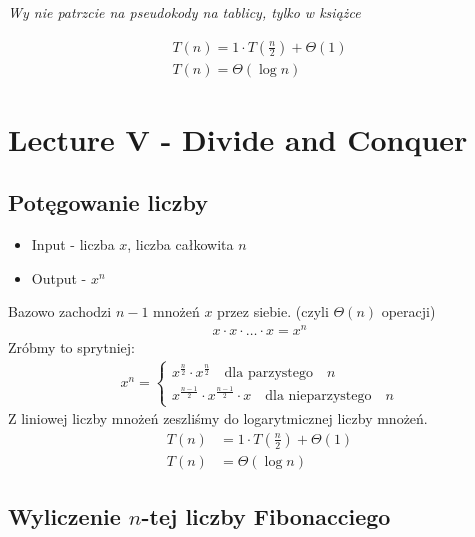 \documentclass{article}
\numberwithin{equation}{subsection}
\begin{document}
\vspace{1cm}

\textit{Wy nie patrzcie na pseudokody na tablicy, tylko w książce}

\vspace{1cm}

\begin{align}
    T(n) = 1 \cdot T\left(\frac{n}{2}\right) + \Theta(1) \\
    T(n) = \Theta(\log n)
\end{align}

\section{Lecture V - Divide and Conquer}

\subsection{Potęgowanie liczby}

\begin{itemize}
    \item Input - liczba $x$, liczba całkowita $n$
    \item Output - $x^n$
\end{itemize}
Bazowo zachodzi $n-1$ mnożeń $x$ przez siebie. (czyli $\Theta(n)$ operacji)
\begin{align}
    x \cdot x \cdot \dots \cdot x = x^{n}
\end{align}
Zróbmy to sprytniej:
\begin{align}
    x^n = \begin{cases}
        x^{\frac{n}{2}} \cdot x^{\frac{n}{2}} \quad \text{dla parzystego} \quad n\\
        x^{\frac{n-1}{2}} \cdot x^{\frac{n-1}{2}} \cdot x \quad \text{dla nieparzystego} \quad n
    \end{cases}
\end{align}
Z liniowej liczby mnożeń zeszliśmy do logarytmicznej liczby mnożeń.\\
\begin{align}
    T(n) &= 1\cdot T\left(\frac{n}{2}\right) + \Theta(1)\\
    T(n) &= \Theta(\log n)
\end{align}

\subsection{Wyliczenie $n$-tej liczby Fibonacciego}
\end{document}
